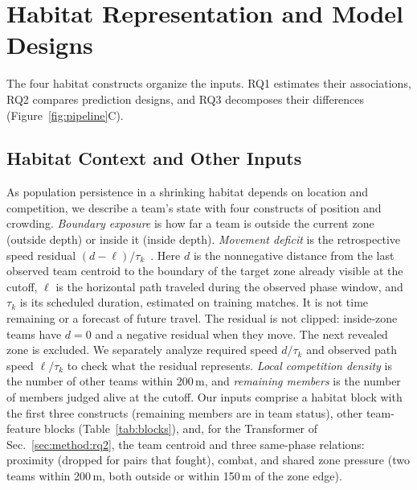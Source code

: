 \documentclass[sigconf,anonymous,nonacm]{acmart}
\begin{document}
\section{Habitat Representation and Model Designs}
\label{sec:method:design}
The four habitat constructs organize the inputs. RQ1 estimates their associations, RQ2 compares prediction designs, and RQ3 decomposes their differences (Figure~\ref{fig:pipeline}C).

\subsection{Habitat Context and Other Inputs}
\label{sec:method:representation}
As population persistence in a shrinking habitat depends on location and competition, we describe a team's state with four constructs of position and crowding.
\emph{Boundary exposure} is how far a team is outside the current zone (outside depth) or inside it (inside depth).
\emph{Movement deficit} is the retrospective speed residual $(d-\ell)/\tau_k$~\cite{Nathan08}. Here $d$ is the nonnegative distance from the last observed team centroid to the boundary of the target zone already visible at the cutoff, $\ell$ is the horizontal path traveled during the observed phase window, and $\tau_k$ is its scheduled duration, estimated on training matches. It is not time remaining or a forecast of future travel. The residual is not clipped: inside-zone teams have $d=0$ and a negative residual when they move. The next revealed zone is excluded. We separately analyze required speed $d/\tau_k$ and observed path speed $\ell/\tau_k$ to check what the residual represents.
\emph{Local competition density} is the number of other teams within 200\,m, and \emph{remaining members} is the number of members judged alive at the cutoff.
Our inputs comprise a habitat block with the first three constructs (remaining members are in team status), other team-feature blocks (Table~\ref{tab:blocks}), and, for the Transformer of Sec.~\ref{sec:method:rq2}, the team centroid and three same-phase relations: proximity (dropped for pairs that fought), combat, and shared zone pressure (two teams within 200\,m, both outside or within 150\,m of the zone edge).
\end{document}
